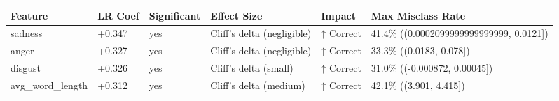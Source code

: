 \begin{tabular}{llllll}
\toprule
Feature & LR Coef & Significant & Effect Size & Impact & Max Misclass Rate \\
\midrule
sadness & +0.347 & yes & Cliff's delta (negligible) & ↑ Correct & 41.4\% ((0.0002099999999999999, 0.0121]) \\
anger & +0.327 & yes & Cliff's delta (negligible) & ↑ Correct & 33.3\% ((0.0183, 0.078]) \\
disgust & +0.326 & yes & Cliff's delta (small) & ↑ Correct & 31.0\% ((-0.000872, 0.00045]) \\
avg\_word\_length & +0.312 & yes & Cliff's delta (medium) & ↑ Correct & 42.1\% ((3.901, 4.415]) \\
\bottomrule
\end{tabular}
